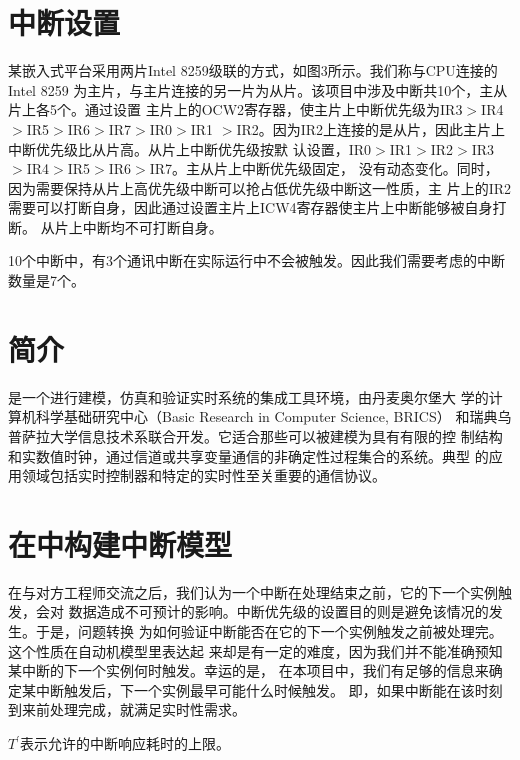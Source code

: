 \section{中断设置}
\label{sec:intr_setting}

某嵌入式平台采用两片Intel 8259级联的方式，如图3所示。我们称与CPU连接的Intel 8259
为主片，与主片连接的另一片为从片。该项目中涉及中断共10个，主从片上各5个。通过设置
主片上的OCW2寄存器，使主片上中断优先级为IR3$>$IR4$>$IR5$>$IR6$>$IR7$>$IR0$>$IR1
$>$IR2。因为IR2上连接的是从片，因此主片上中断优先级比从片高。从片上中断优先级按默
认设置，IR0$>$IR1$>$IR2$>$IR3$>$IR4$>$IR5$>$IR6$>$IR7。主从片上中断优先级固定，
没有动态变化。同时，因为需要保持从片上高优先级中断可以抢占低优先级中断这一性质，主
片上的IR2需要可以打断自身，因此通过设置主片上ICW4寄存器使主片上中断能够被自身打断。
从片上中断均不可打断自身。

10个中断中，有3个通讯中断在实际运行中不会被触发。因此我们需要考虑的中断数量是7个。

\section{\uppaal 简介}
\label{sec:Uppaal_intro}

\uppaal 是一个进行建模，仿真和验证实时系统的集成工具环境，由丹麦奥尔堡大
学的计算机科学基础研究中心（Basic Research in Computer Science, BRICS）
和瑞典乌普萨拉大学信息技术系联合开发。它适合那些可以被建模为具有有限的控
制结构和实数值时钟，通过信道或共享变量通信的非确定性过程集合的系统。典型
的应用领域包括实时控制器和特定的实时性至关重要的通信协议。\cite{Behrmann04atutorial}

\section{在\uppaal 中构建中断模型}
\label{sec:build}

在与对方工程师交流之后，我们认为一个中断在处理结束之前，它的下一个实例触发，会对
数据造成不可预计的影响。中断优先级的设置目的则是避免该情况的发生。于是，问题转换
为如何验证中断能否在它的下一个实例触发之前被处理完。这个性质在自动机模型里表达起
来却是有一定的难度，因为我们并不能准确预知某中断的下一个实例何时触发。幸运的是，
在本项目中，我们有足够的信息来确定某中断触发后，下一个实例最早可能什么时候触发。
即，如果中断能在该时刻到来前处理完成，就满足实时性需求。

\begin{definition}
	$T^\prime$表示允许的中断响应耗时的上限。
	\label{def:T_prime}
\end{definition}

